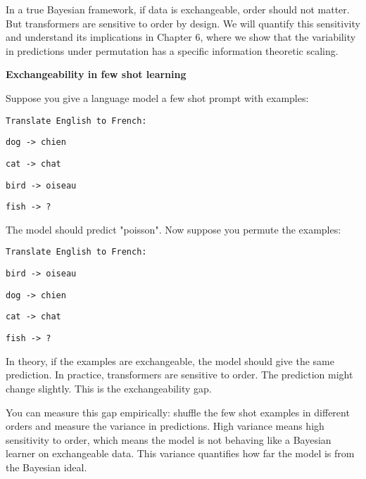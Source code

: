 In a true Bayesian framework, if data is exchangeable, order should not matter. But transformers are sensitive to order by design. We will quantify this sensitivity and understand its implications in Chapter 6, where we show that the variability in predictions under permutation has a specific information theoretic scaling.

\vspace{1.5em}

\begin{examplebox}
\textbf{Exchangeability in few shot learning}

\vspace{0.5em}

Suppose you give a language model a few shot prompt with examples:

\vspace{0.5em}

\texttt{Translate English to French:}

\texttt{dog -> chien}

\texttt{cat -> chat}

\texttt{bird -> oiseau}

\texttt{fish -> ?}

\vspace{0.5em}

The model should predict "poisson". Now suppose you permute the examples:

\vspace{0.5em}

\texttt{Translate English to French:}

\texttt{bird -> oiseau}

\texttt{dog -> chien}

\texttt{cat -> chat}

\texttt{fish -> ?}

\vspace{0.5em}

In theory, if the examples are exchangeable, the model should give the same prediction. In practice, transformers are sensitive to order. The prediction might change slightly. This is the exchangeability gap.

\vspace{0.5em}

You can measure this gap empirically: shuffle the few shot examples in different orders and measure the variance in predictions. High variance means high sensitivity to order, which means the model is not behaving like a Bayesian learner on exchangeable data. This variance quantifies how far the model is from the Bayesian ideal.
\end{examplebox}

